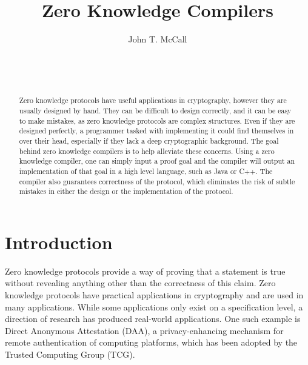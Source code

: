 \documentclass{sig-alternate}
\begin{document}

\title{Zero Knowledge Compilers}


\author{
\alignauthor
John T. McCall\\
	\\
	\\
	\\
}

\maketitle

\begin{abstract}
Zero knowledge protocols have useful applications in cryptography,
however they are usually designed by hand. They can be difficult to
design correctly, and it can be easy to make mistakes, as zero knowledge 
protocols are complex structures. Even if they are designed perfectly,
a programmer tasked with implementing it could find themselves in over
their head, especially if they lack a deep cryptographic background.
The goal behind zero knowledge compilers is to help alleviate these
concerns. Using a zero knowledge compiler, one can simply input a proof
goal and the compiler will output an implementation of that goal in a
high level language, such as Java or C++. The compiler also guarantees
correctness of the protocol, which eliminates the risk of subtle mistakes
in either the design or the implementation of the protocol.

\end{abstract}


\section{Introduction}
	Zero knowledge protocols provide a way of proving that a statement is true
	without revealing anything other than the correctness of this claim. Zero
	knowledge protocols have practical applications in cryptography and
	are used in many applications. While some applications only exist
	on a specification level, a direction of research has produced real-world
	applications. One such example is Direct Anonymous Attestation (DAA),
	a privacy-enhancing mechanism for remote authentication of computing
	platforms, which has been adopted by the Trusted Computing Group (TCG).
	
\end{document}
